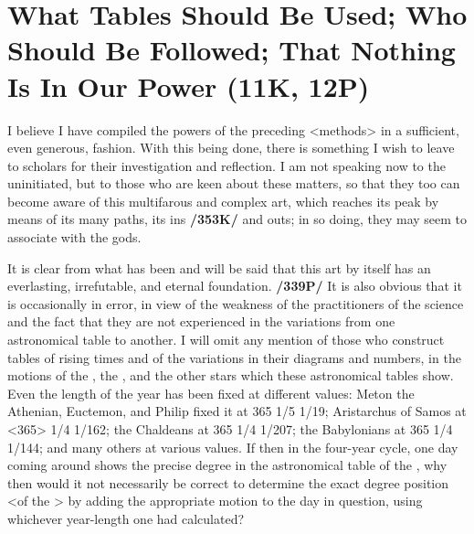 \section{What Tables Should Be Used; Who Should Be Followed; That Nothing Is In Our Power (11K, 12P)}

I believe I have compiled the powers of the preceding <methods> in a sufficient, even generous, fashion. With this being done, there is something I wish to leave to scholars for their investigation and reflection. I am not speaking now to the uninitiated, but to those who are keen about these matters, so that they too can become aware of this multifarous and complex art, which reaches its peak by means of its many paths, its ins \textbf{/353K/} and outs; in so doing, they may seem to associate with the gods. 

It is clear from what has been and will be said that this art by itself has an everlasting, irrefutable, and eternal foundation. \textbf{/339P/} It is also obvious that it is occasionally in error, in view of the weakness of the practitioners of the science and the fact that they are not experienced in the variations from one astronomical table to another. I will omit any mention of those who construct tables of rising times and of the variations in their diagrams and numbers, in the motions of the \Sun, the \Moon, and the other stars which these astronomical tables show. Even the length of the year has been fixed at different values: Meton the Athenian, Euctemon, and Philip fixed it at 365 1/5 1/19; Aristarchus of Samos at <365> 1/4 1/162; the Chaldeans at 365 1/4 1/207; the Babylonians at 365 1/4 1/144; and many others at various values. If then in the four-year cycle, one day coming around shows the precise degree in the astronomical table of the \Sun, why then would it not necessarily be correct to determine the exact degree position <of the \Sun> by adding the appropriate motion to the day in question, using whichever year-length one had calculated?

